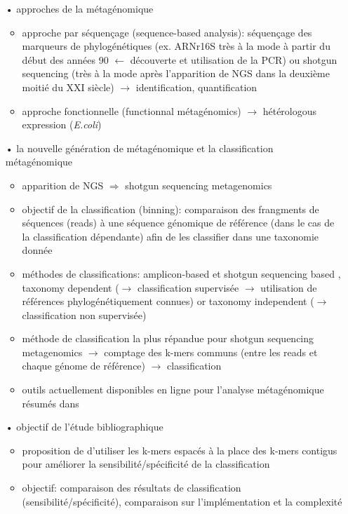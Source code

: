 \begin{itemize}
        \item[•] approches de la métagénomique
          \begin{itemize}
          \item approche par séquençage (sequence-based analysis): séquençage des marqueurs de phylogénétiques (ex. ARNr16S très à la mode à partir du début des années 90 $\leftarrow$ découverte et utilisation de la PCR) ou shotgun sequencing (très à la mode après l'apparition de NGS dans la deuxième moitié du XXI siècle) $\rightarrow$ identification, quantification
          \item approche fonctionnelle (functionnal métagénomics) $\rightarrow$ hétérologous expression (\textit{E.coli})
          \end{itemize}
          
        \item[•] la nouvelle génération de métagénomique et la classification métagénomique
          \begin{itemize}
          \item apparition de NGS $\Rightarrow$ shotgun sequencing metagenomics \cite{Ranjan2015}
          \item objectif de la classification (binning): comparaison des frangments de séquences (reads) à une séquence génomique de référence (dans le cas de la classification dépendante) afin de les classifier dans une taxonomie donnée
          \item méthodes de classifications: amplicon-based et shotgun sequencing based \cite{Mande2012}, taxonomy dependent ($\rightarrow$ classification supervisée $\rightarrow$ utilisation de références phylogénétiquement connues) or taxonomy independent ($\rightarrow$ classification non supervisée)
          \item méthode de classification la plus répandue pour shotgun sequencing metagenomics $\rightarrow$ comptage des k-mers communs (entre les reads et chaque génome de référence) $\rightarrow$ classification
          \item outils actuellement disponibles en ligne pour l'analyse métagénomique résumés dans \cite{Dudhagara2015}
          \end{itemize}

        \item[•] objectif de l'étude bibliographique
          \begin{itemize}
            \item proposition de \cite{Brinda2015} d'utiliser les k-mers espacés à la place des k-mers contigus pour améliorer la sensibilité/spécificité de la classification
            \item objectif: comparaison des résultats de classification (sensibilité/spécificité), comparaison sur l'implémentation et la complexité
          \end{itemize}
	\end{itemize}
